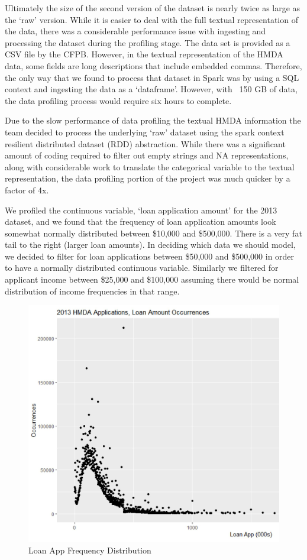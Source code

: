 \documentclass[conference,compsoc]{IEEEtran}
\begin{document}
Ultimately the size of the second version of the dataset is nearly twice as large as the ‘raw’ version.  While it is easier to deal with the full textual representation of the data, there was a considerable performance issue with ingesting and processing the dataset during the profiling stage.  The data set is provided as a CSV file by the CFPB.  However, in the textual representation of the HMDA data, some fields are long descriptions that include embedded commas.  Therefore, the only way that we found to process that dataset in Spark was by using a SQL context and ingesting the data as a ‘dataframe’.  However, with ~150 GB of data, the data profiling process would require six hours to complete.  

Due to the slow performance of data profiling the textual HMDA information the team decided to process the underlying ‘raw’ dataset using the spark context resilient distributed dataset (RDD) abstraction.  While there was a significant amount of coding required to filter out empty strings and NA representations, along with considerable work to translate the categorical variable to the textual representation, the data profiling portion of the project was much quicker by a factor of 4x. 

We profiled the continuous variable, ‘loan application amount’ for the 2013 dataset, and we found that the frequency of loan application amounts look somewhat normally distributed between \$10,000 and \$500,000.  There is a very fat tail to the right (larger loan amounts).  In deciding which data we should model, we decided to filter for loan applications between \$50,000 and \$500,000 in order to have a normally distributed continuous variable.  Similarly we filtered for applicant income between \$25,000 and \$100,000 assuming there would be normal distribution of income frequencies in that range. 

\begin{figure}[h!]
  \includegraphics[width=\linewidth]{Loan_App_Dist.jpg}
  \caption{Loan App Frequency Distribution}
  \label{fig:design}
\end{figure}
\end{document}
